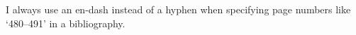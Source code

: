 I always use an en-dash instead of a hyphen when specifying page numbers like `480--491' in a bibliography.
